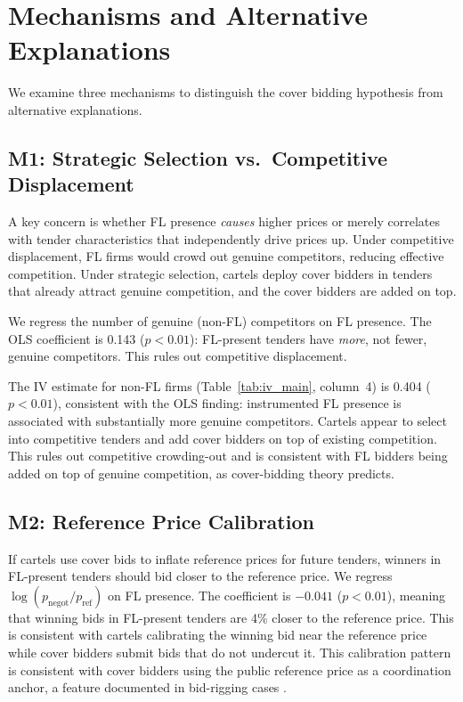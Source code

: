 \section{Mechanisms and Alternative Explanations}
\label{sec:mechanisms}

We examine three mechanisms to distinguish the cover bidding hypothesis
from alternative explanations.

\subsection{M1: Strategic Selection vs.\ Competitive Displacement}

A key concern is whether FL presence \emph{causes} higher prices or
merely correlates with tender characteristics that independently drive
prices up. Under competitive displacement, FL firms would crowd out
genuine competitors, reducing effective competition. Under strategic
selection, cartels deploy cover bidders in tenders that already attract
genuine competition, and the cover bidders are added on top.

We regress the number of genuine (non-FL) competitors on FL presence.
The OLS coefficient is 0.143 ($p < 0.01$): FL-present tenders have
\emph{more}, not fewer, genuine competitors. This rules out competitive
displacement.

The IV estimate for non-FL firms (Table~\ref{tab:iv_main}, column~4) is
0.404 ($p < 0.01$), consistent with the OLS finding: instrumented FL presence
is associated with substantially more genuine competitors. Cartels
appear to select into competitive tenders and add cover bidders on top
of existing competition. This rules out competitive crowding-out and is
consistent with FL bidders being added on top of genuine competition, as
cover-bidding theory predicts.

\subsection{M2: Reference Price Calibration}

If cartels use cover bids to inflate reference prices for future
tenders, winners in FL-present tenders should bid closer to the
reference price. We regress $\log(p_{\text{negot}} / p_{\text{ref}})$ on
FL presence. The coefficient is $-0.041$ ($p < 0.01$), meaning
that winning bids in FL-present tenders are 4\% closer to the reference
price. This is consistent with cartels calibrating the winning bid near
the reference price while cover bidders submit bids that do not
undercut it. This calibration pattern is consistent with cover bidders
using the public reference price as a coordination anchor, a feature
documented in bid-rigging cases \citep{marshall2012economics}.

